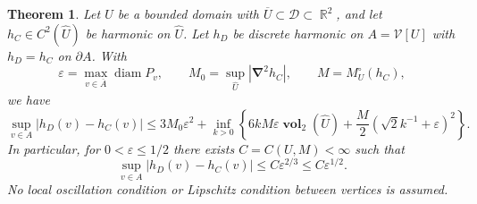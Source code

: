 \documentclass[12pt]{amsart}
\numberwithin{equation}{section}
\DeclareMathOperator{\R}{\mathbb{R}}
\DeclareMathOperator{\diam}{{\mathop{diam}}}
\newtheorem{theorem}{Theorem}[section]
\newcommand{\V}{\mathcal{V}}
\newcommand{\eps}{\varepsilon}
\newcommand{\Cnabla}{\boldsymbol{\nabla}}
\DeclareMathOperator{\vol}{\mathbf{vol}}
\begin{document}
\begin{theorem}
\label{theorem:2d}
Let $U$ be a bounded domain with $\overline U\subset\mathcal D\subset\R^2$, and let $h_C\in C^2(\widehat U)$ be harmonic on $\widehat U$. Let $h_D$ be discrete harmonic on $A=\V[U]$ with $h_D=h_C$ on $\partial A$. With
\[
 \eps=\max_{v\in\overline A}\diam P_v,\qquad
 M_0=\sup_{\widehat U}|\Cnabla^2h_C|,\qquad M=M_U^\circ(h_C),
\]
we have
\begin{equation}\label{eq:planar-quadratic-close}
 \sup_{v\in A}|h_D(v)-h_C(v)|
 \le3M_0\eps^2+\inf_{k>0}\left\{
 6kM\eps\vol_2(\widehat U)+\frac M2(\sqrt2 k^{-1}+\eps)^2\right\}.
\end{equation}
In particular, for $0<\eps\le1/2$ there exists $C=C(U,M)<\infty$ such that
\[
 \sup_{v\in A}|h_D(v)-h_C(v)|\le C\eps^{2/3}\le C\eps^{1/2}.
\]
No local oscillation condition or Lipschitz condition between vertices is assumed.
\end{theorem}
\end{document}
